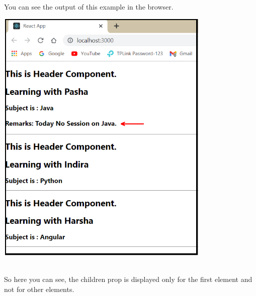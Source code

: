 \documentclass{article}
\begin{document}
\noindent 
\newpage
\noindent
You can see the output of this example in the browser.

\begin{center}
	\noindent \includegraphics*[width=4.05in, height=4.91in]{IMG-08-23}
\end{center}

\noindent 

\noindent \\
So here you can see, the children prop is displayed only for the first element and not for other elements.
\end{document}
